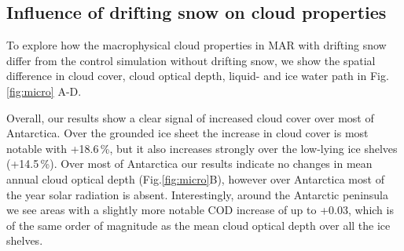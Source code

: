 \documentclass[draft]{agujournal2019}
\begin{document}
\subsection{Influence of drifting snow on cloud properties}



To explore how the macrophysical cloud properties in MAR with drifting snow differ from the control simulation without drifting snow, we show the spatial difference in cloud cover, cloud optical depth, liquid- and ice water path in Fig.\ref{fig:micro} A-D.

Overall, our results show a clear signal of increased cloud cover over most of Antarctica. Over the grounded ice sheet the increase in cloud cover is most notable with +18.6\,\%, but it also increases strongly over the low-lying ice shelves (+14.5\,\%). Over most of Antarctica our results indicate no changes in mean annual cloud optical depth (Fig.\ref{fig:micro}B), however over Antarctica most of the year solar radiation is absent. Interestingly, around the Antarctic peninsula we see areas with a slightly more notable COD increase of up to +0.03, which is of the same order of magnitude as the mean cloud optical depth over all the ice shelves.
\end{document}
